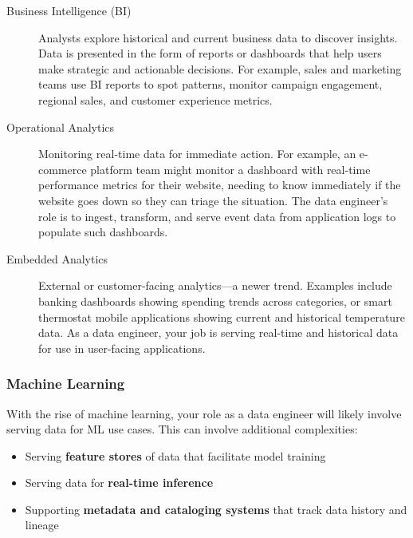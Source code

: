 \documentclass{article}
\begin{document}
\begin{description}
    \item[Business Intelligence (BI)] Analysts explore historical and current business data to discover insights. Data is presented in the form of reports or dashboards that help users make strategic and actionable decisions. For example, sales and marketing teams use BI reports to spot patterns, monitor campaign engagement, regional sales, and customer experience metrics.

    \item[Operational Analytics] Monitoring real-time data for immediate action. For example, an e-commerce platform team might monitor a dashboard with real-time performance metrics for their website, needing to know immediately if the website goes down so they can triage the situation. The data engineer's role is to ingest, transform, and serve event data from application logs to populate such dashboards.

    \item[Embedded Analytics] External or customer-facing analytics---a newer trend. Examples include banking dashboards showing spending trends across categories, or smart thermostat mobile applications showing current and historical temperature data. As a data engineer, your job is serving real-time and historical data for use in user-facing applications.
\end{description}

\subsubsection{Machine Learning}
With the rise of machine learning, your role as a data engineer will likely involve serving data for ML use cases. This can involve additional complexities:
\begin{itemize}
    \item Serving \textbf{feature stores} of data that facilitate model training
    \item Serving data for \textbf{real-time inference}
    \item Supporting \textbf{metadata and cataloging systems} that track data history and lineage
\end{itemize}
\end{document}
